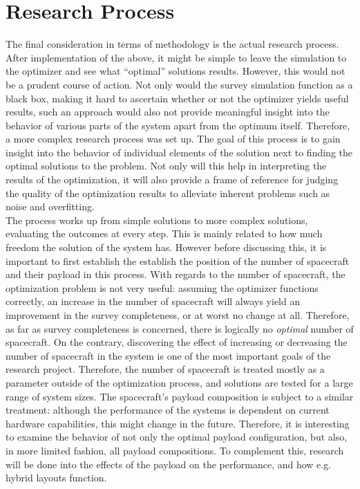 \section{Research Process}
\label{sec:methodologyprocess}
The final consideration in terms of methodology is the actual research process. After implementation of the above, it might be simple to leave the simulation to the optimizer and see what ``optimal'' solutions results. However, this would not be a prudent course of action. Not only would the survey simulation function as a black box, making it hard to ascertain whether or not the optimizer yields useful results, such an approach would also not provide meaningful insight into the behavior of various parts of the system apart from the optimum itself. Therefore, a more complex research process was set up. The goal of this process is to gain insight into the behavior of individual elements of the solution next to finding the optimal solutions to the problem. Not only will this help in interpreting the results of the optimization, it will also provide a frame of reference for judging the quality of the optimization results to alleviate inherent problems such as noise and overfitting.\\

The process works up from simple solutions to more complex solutions, evaluating the outcomes at every step. This is mainly related to how much freedom the solution of the system has. However before discussing this, it is important to first establish the establish the position of the number of spacecraft and their payload in this process. With regards to the number of spacecraft, the optimization problem is not very useful: assuming the optimizer functions correctly, an increase in the number of spacecraft will always yield an improvement in the survey completeness, or at worst no change at all. Therefore, as far as survey completeness is concerned, there is logically no \textit{optimal} number of spacecraft. On the contrary, discovering the effect of increasing or decreasing the number of spacecraft in the system is one of the most important goals of the research project. Therefore, the number of spacecraft is treated mostly as a parameter outside of the optimization process, and solutions are tested for a large range of system sizes. The spacecraft's payload composition is subject to a similar treatment: although the performance of the systems is dependent on current hardware capabilities, this might change in the future. Therefore, it is interesting to examine the behavior of not only the optimal payload configuration, but also, in more limited fashion, all payload compositions. To complement this, research will be done into the effects of the payload on the performance, and how e.g. hybrid layouts function.\\

